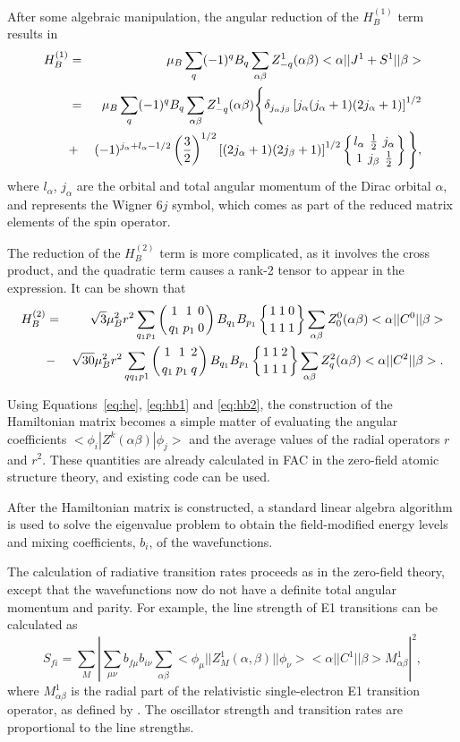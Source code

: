 After some algebraic manipulation, the angular reduction of the $H_B^{(1)}$
term results in
\begin{eqnarray}
\label{eq:hb1}
H_B^{(1)} &=& \mu_B\sum_q (-1)^q B_q\sum_{\alpha\beta}
Z^1_{-q}(\alpha\beta)<\alpha||J^1 + S^1||\beta> \nonumber\\
&=& \mu_B\sum_q (-1)^q B_q\sum_{\alpha\beta}Z^1_{-q}(\alpha\beta)
\Bigg\{\delta_{j_\alpha
   j_\beta}\left[j_\alpha(j_\alpha+1)(2j_\alpha+1)\right]^{1/2} \nonumber\\
&+&
(-1)^{j_\alpha+l_\alpha-1/2}\left(\frac{3}{2}\right)^{1/2}
\left[(2j_\alpha+1)(2j_\beta+1)\right]^{1/2}
\sixj{l_\alpha}{\frac{1}{2}}{j_\alpha}{1}{j_\beta}{\frac{1}{2}}\Bigg\},
\end{eqnarray}
where $l_\alpha$, $j_\alpha$ are the orbital and total angular momentum of
the Dirac orbital $\alpha$, and  represents the Wigner
$6j$ symbol, which comes as part of the reduced matrix elements of the spin
operator.

The reduction of the $H_{B}^{(2)}$ term is more complicated, as it involves
the cross product, and the quadratic term causes a rank-2 tensor to
appear in the expression. It can be shown that
\begin{eqnarray}
\label{eq:hb2}
H_B^{(2)} &=& \sqrt{3}\mu_B^2r^2\sum_{q_1p_1}
\threej{1}{1}{0}{q_1}{p_1}{0}B_{q_1}B_{p_1}\sixj{1}{1}{0}{1}{1}{1}
\sum_{\alpha\beta}Z^0_0(\alpha\beta)<\alpha||C^0||\beta>
\nonumber \\
&-&\sqrt{30}\mu_B^2r^2\sum_{qq_1p1}\threej{1}{1}{2}{q_1}{p_1}{q}B_{q_1}B_{p_1}
\sixj{1}{1}{2}{1}{1}{1}
  \sum_{\alpha\beta}Z^2_q(\alpha\beta)<\alpha||C^2||\beta>.
\end{eqnarray}

Using Equations~\ref{eq:he}, \ref{eq:hb1} and \ref{eq:hb2}, the construction
of the Hamiltonian matrix becomes a simple matter of evaluating the angular
coefficients $<\phi_i|Z^k(\alpha\beta)|\phi_j>$ and the average values of the
radial operators $r$ and $r^2$. These quantities are already calculated in FAC
in the zero-field atomic structure theory, and existing code can be used.

After the Hamiltonian matrix is constructed, a standard linear algebra
algorithm is used to solve the eigenvalue problem to obtain the field-modified
energy levels and mixing coefficients, $b_i$, of the wavefunctions.

The calculation of radiative transition rates proceeds as in the zero-field
theory, except that the
wavefunctions now do not have a definite total angular momentum and
parity. For example, the line strength of E1 transitions can be calculated as
\begin{equation}
S_{fi} = \sum_M\left|\sum_{\mu\nu}b_{f\mu}b_{i\nu}\sum_{\alpha\beta}
<\phi_\mu||Z^1_M(\alpha,\beta)||\phi_\nu><\alpha||C^1||\beta>
M^1_{\alpha\beta}\right|^2 ,
\end{equation}
where $M^1_{\alpha\beta}$ is the radial part of the relativistic
single-electron E1 transition operator, as defined by \citet{grant:1974a}. The
oscillator strength and transition rates are proportional to the line
strengths.
